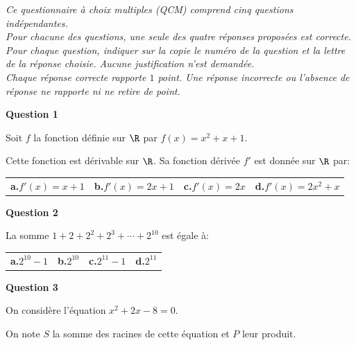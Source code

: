 \bigskip

\emph{Ce questionnaire à choix multiples (QCM) comprend cinq questions indépendantes.\\
Pour chacune des questions, une seule des quatre réponses proposées est correcte.\\
Pour chaque question, indiquer sur la copie le numéro de la question et la lettre de la réponse choisie. Aucune justification n’est demandée.\\
Chaque réponse correcte rapporte $1$ point. Une réponse incorrecte ou l'absence de réponse ne rapporte ni ne retire de point.}

\bigskip

\textbf{Question 1}

\medskip

Soit $f$ la fonction définie sur $\R$ par $f(x) = x^2+x+1$.

Cette fonction est dérivable sur $\R$. Sa fonction dérivée $f'$ est donnée sur $\R$ par:

\begin{center}
{\renewcommand{\arraystretch}{1.5}
\begin{tabularx}{\linewidth}{XXXX}
\textbf{a.}\quad $f'(x)=x+1$ & \textbf{b.}\quad $f'(x)=2x+1$ 
& \textbf{c.}\quad $f'(x)=2x$   & \textbf{d.}\quad $f'(x)=2x^2+x$\\
\end{tabularx}}
\end{center}

\medskip

\textbf{Question 2}

\medskip

La somme $1+2+2^2 + 2^3 + \cdots + 2^{10}$ est égale à:

\begin{center}
{\renewcommand{\arraystretch}{1.5}
\begin{tabularx}{0.9\linewidth}{XXXX}
\textbf{a.}\quad $2^{10}-1$ & \textbf{b.}\quad $2^{10}$ 
& \textbf{c.}\quad $2^{11}-1$   & \textbf{d.}\quad $2^{11}$\\
\end{tabularx}}
\end{center}

\medskip

\textbf{Question 3}

\medskip

On considère l'équation $x^2+2x-8=0$.

On note $S$ la somme des racines de cette équation et $P$ leur produit.

